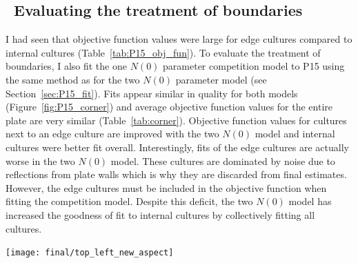 \begin{multicols}{2}



\subsection{\thesubsection~Evaluating the treatment of boundaries}
\label{sec:treatment_of_boundaries}

I had seen that objective function values were large for edge cultures
compared to internal cultures (Table~\ref{tab:P15_obj_fun}). To
evaluate the treatment of boundaries, I also fit the one \(N(0)\)
parameter competition model to P15 using the same method as for the
two \(N(0)\) parameter model (see Section~\ref{sec:P15_fit}). Fits
appear similar in quality for both models
(Figure~\ref{fig:P15_corner}) and average objective function values
for the entire plate are very similar
(Table~\ref{tab:corner}). Objective function values for cultures next
to an edge culture are improved with the two \(N(0)\) model and
internal cultures were better fit overall. Interestingly, fits of the
edge cultures are actually worse in the two \(N(0)\) model. These
cultures are dominated by noise due to reflections from plate walls
which is why they are discarded from final estimates. However, the
edge cultures must be included in the objective function when fitting
the competition model. Despite this deficit, the two \(N(0)\) model
has increased the goodness of fit to internal cultures by collectively
fitting all cultures.


\graphicspath{{images/corners/}}
\begin{Figure}
  \centering
  \texttt{[image: final/top\_left\_new\_aspect]}
  \label{fig:P15_corner}
\end{Figure}



\end{multicols}

